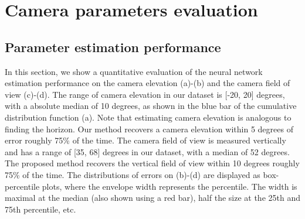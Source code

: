 \protect\hypertarget{camparameval}{}{}

\hypertarget{camera-parameters-evaluation}{%
\section{Camera parameters
evaluation}\label{camera-parameters-evaluation}}

\protect\hypertarget{camparamestimperf}{}{}

\hypertarget{parameter-estimation-performance}{%
\subsection{Parameter estimation
performance}\label{parameter-estimation-performance}}

In this section, we show a quantitative evaluation of the neural network
estimation performance on the camera elevation (a)-(b) and the camera
field of view (c)-(d). The range of camera elevation in our dataset is
{[}-20, 20{]} degrees, with a absolute median of 10 degrees, as shown in
the blue bar of the cumulative distribution function (a). Note that
estimating camera elevation is analogous to finding the horizon. Our
method recovers a camera elevation within 5 degrees of error roughly
75\% of the time. The camera field of view is measured vertically and
has a range of {[}35, 68{]} degrees in our dataset, with a median of 52
degrees. The proposed method recovers the vertical field of view within
10 degrees roughly 75\% of the time. The distributions of errors on
(b)-(d) are displayed as box-percentile plots, where the envelope width
represents the percentile. The width is maximal at the median (also
shown using a red bar), half the size at the 25th and 75th percentile,
etc.

